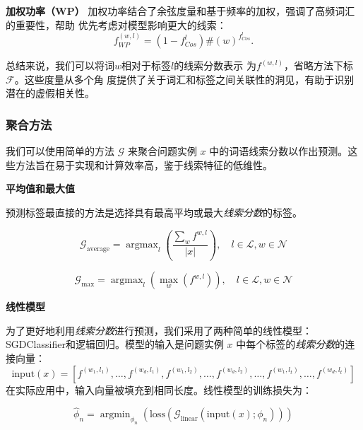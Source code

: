 \textbf{加权功率（WP）}
加权功率结合了余弦度量和基于频率的加权，强调了高频词汇的重要性，帮助
优先考虑对模型影响更大的线索：
\begin{equation}
f_{WP}^{(w,l)} = (1-f_{Cos}^{l})\#(w)^{f_{Cos}^{l}}.
\end{equation}

总结来说，我们可以将词\(w\)相对于标签\(l\)的线索分数表示
为\(f^{(w,l)}\)，省略方法下标\(\mathcal{F}\)。这些度量从多个角
度提供了关于词汇和标签之间关联性的洞见，有助于识别潜在的虚假相关性。

\subsubsection{聚合方法}

我们可以使用简单的方法 \(\mathcal{G}\) 来聚合问题实例 \(x\) 中的词语线索分数以作出预测。这些方法旨在易于实现和计算效率高，鉴于线索特征的低维性。

\textbf{平均值和最大值}

预测标签最直接的方法是选择具有最高平均或最大\textit{线索分数}的标签。

\begin{equation}
    \mathcal{G}_{\text{average}} = \mathop{\arg\max}_{l} \left(\frac{\sum_{w}f^{w,l}}{|x|}\right), \quad l \in \mathcal{L}, w \in \mathcal{N}
\end{equation}

\begin{equation}
    \mathcal{G}_{\text{max}} = \mathop{\arg\max}_{l} \left(\max_w(f^{w,l})\right),
    \quad l \in \mathcal{L}, w \in \mathcal{N}
\end{equation}

\textbf{线性模型}

为了更好地利用\textit{线索分数}进行预测，我们采用了两种简单的线性模型：SGDClassifier和逻辑回归。模型的输入是问题实例 \(x\) 中每个标签的\textit{线索分数}的连接向量：
\begin{equation}
\text{input}(x) = [ f^{(w_1, l_1)}, \ldots, f^{(w_d, l_1)}, f^{(w_1, l_2)}, \ldots, f^{(w_d,l_2)}, \ldots, f^{(w_1,l_t)}, \ldots, f^{(w_d,l_t)}]
\end{equation}
在实际应用中，输入向量被填充到相同长度。线性模型的训练损失为：

\begin{equation}
    \hat{\phi}_n = \mathop{\arg\min}_{\phi_n} \left(\text{loss}\left(\mathcal{G}_{\text{linear}}(\text{input}(x); \phi_n)\right)\right)
\end{equation}

